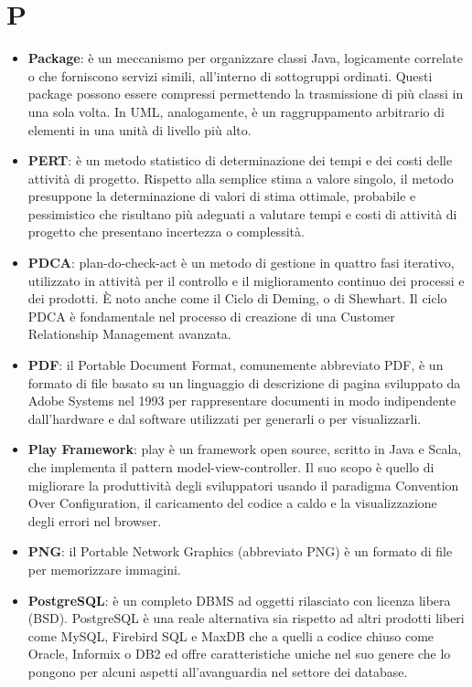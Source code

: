 \section{P}
\begin{itemize} 
	\item
	\textbf{Package}: è un meccanismo per organizzare classi Java, logicamente correlate o che forniscono servizi simili, all’interno di sottogruppi ordinati. Questi package possono essere compressi permettendo la trasmissione di più classi in una sola volta.
	In UML, analogamente, è un raggruppamento arbitrario di elementi in una unità di livello più alto.
	\item
	\textbf{PERT}: è un metodo statistico di determinazione dei tempi e dei costi delle attività di progetto. Rispetto alla semplice stima a valore singolo, il metodo presuppone la determinazione di valori di stima ottimale, probabile e pessimistico che risultano più adeguati a valutare tempi e costi di attività di progetto che presentano incertezza o complessità.
	\item
	\textbf{PDCA}: plan-do-check-act è un metodo di gestione in quattro fasi iterativo, utilizzato in attività per il controllo e il miglioramento continuo dei processi e dei prodotti. È noto anche come il Ciclo di Deming, o di Shewhart. Il ciclo PDCA è fondamentale nel processo di creazione di una Customer Relationship Management avanzata. 
	\item
	\textbf{PDF}: il Portable Document Format, comunemente abbreviato PDF, è un formato di file basato su un linguaggio di descrizione di pagina sviluppato da Adobe Systems nel 1993 per rappresentare documenti in modo indipendente dall’hardware e dal software utilizzati per generarli o per visualizzarli.
	\item
	\textbf{Play Framework}: play è un framework open source, scritto in Java e Scala, che implementa il pattern model-view-controller. Il suo scopo è quello di migliorare la produttività degli sviluppatori usando il paradigma Convention Over Configuration, il caricamento del codice a caldo e la visualizzazione degli errori nel browser.
	\item
	\textbf{PNG}: il Portable Network Graphics (abbreviato PNG) è un formato di file per memorizzare immagini.
	\item
	\textbf{PostgreSQL}: è un completo DBMS ad oggetti rilasciato con licenza libera (BSD).
	PostgreSQL è una reale alternativa sia rispetto ad altri prodotti liberi come MySQL, Firebird SQL e MaxDB che a quelli a codice chiuso come Oracle, Informix o DB2 ed offre caratteristiche uniche nel suo genere che lo pongono per alcuni aspetti all'avanguardia nel settore dei database.
\end{itemize}

